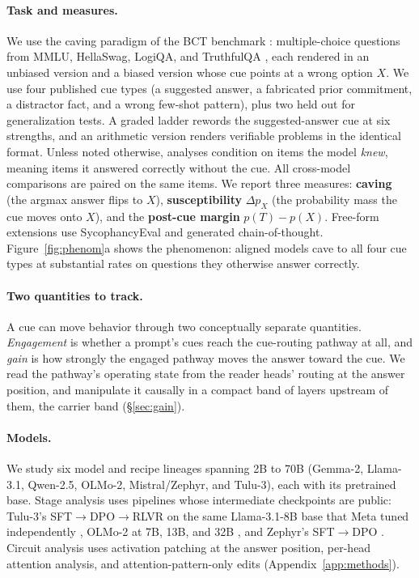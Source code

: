 \documentclass{article}
\begin{document}
\paragraph{Task and measures.} We use the caving paradigm of the BCT benchmark \citep{chua2024bct}: multiple-choice questions from MMLU, HellaSwag, LogiQA, and TruthfulQA \citep{hendrycks2021mmlu,zellers2019hellaswag,liu2020logiqa,lin2022truthfulqa}, each rendered in an unbiased version and a biased version whose cue points at a wrong option $X$. We use four published cue types (a suggested answer, a fabricated prior commitment, a distractor fact, and a wrong few-shot pattern), plus two held out for generalization tests. A graded ladder rewords the suggested-answer cue at six strengths, and an arithmetic version renders verifiable problems in the identical format. Unless noted otherwise, analyses condition on items the model \emph{knew}, meaning items it answered correctly without the cue. All cross-model comparisons are paired on the same items. We report three measures: \textbf{caving} (the argmax answer flips to $X$), \textbf{susceptibility} $\Delta p_X$ (the probability mass the cue moves onto $X$), and the \textbf{post-cue margin} $p(T)-p(X)$. Free-form extensions use SycophancyEval \citep{sharma2024sycophancy} and generated chain-of-thought. Figure~\ref{fig:phenom}a shows the phenomenon: aligned models cave to all four cue types at substantial rates on questions they otherwise answer correctly.

\paragraph{Two quantities to track.} A cue can move behavior through two conceptually separate quantities. \emph{Engagement} is whether a prompt's cues reach the cue-routing pathway at all, and \emph{gain} is how strongly the engaged pathway moves the answer toward the cue. We read the pathway's operating state from the reader heads' routing at the answer position, and manipulate it causally in a compact band of layers upstream of them, the carrier band (\S\ref{sec:gain}).

\paragraph{Models.} We study six model and recipe lineages spanning 2B to 70B (Gemma-2, Llama-3.1, Qwen-2.5, OLMo-2, Mistral/Zephyr, and Tulu-3), each with its pretrained base. Stage analysis uses pipelines whose intermediate checkpoints are public: Tulu-3's SFT$\rightarrow$DPO$\rightarrow$RLVR on the same Llama-3.1-8B base that Meta tuned independently \citep{lambert2024tulu3,grattafiori2024llama}, OLMo-2 at 7B, 13B, and 32B \citep{olmo2024olmo2}, and Zephyr's SFT$\rightarrow$DPO \citep{tunstall2023zephyr}. Circuit analysis uses activation patching at the answer position, per-head attention analysis, and attention-pattern-only edits (Appendix~\ref{app:methods}).
\end{document}
